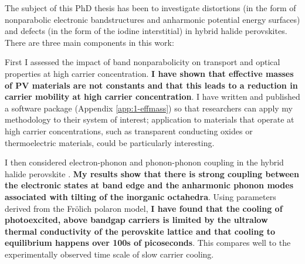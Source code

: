 The subject of this PhD thesis has been to investigate distortions (in the form of nonparabolic electronic bandstructures and anharmonic potential energy surfaces) and defects (in the form of the iodine interstitial) in hybrid halide perovskites. There are three main components in this work:

First I assessed the impact of band nonparabolicity on transport and optical properties at high carrier concentration. \textbf{I have shown that effective masses of PV materials are not constants and that this leads to a reduction in carrier mobility at high carrier concentration}. I have written and published a software package (Appendix \ref{app:1-effmass}) so that researchers can apply my methodology to their system of interest; application to materials that operate at high carrier concentrations, such as transparent conducting oxides or thermoelectric materials, could be particularly interesting.

I then considered electron-phonon and phonon-phonon coupling in the hybrid halide perovskite . \textbf{My results show that there is strong coupling between the electronic states at band edge and the anharmonic phonon modes associated with tilting of the inorganic octahedra}. Using parameters derived from the Fr\"{o}lich polaron model, \textbf{I have found that the cooling of photoexcited, above bandgap carriers is limited by the ultralow thermal conductivity of the perovskite lattice and that cooling to equilibrium happens over 100s of picoseconds}. This compares well to the experimentally observed time scale of slow carrier cooling.

